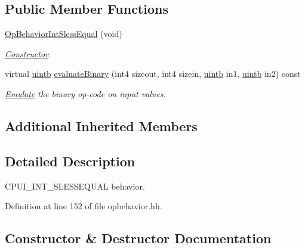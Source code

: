 \subsection*{Public Member Functions}
\begin{DoxyCompactItemize}
\item 
\mbox{\hyperlink{class_op_behavior_int_sless_equal_acd8be4a88098b0fa2cd90ee7ad3f614b}{Op\+Behavior\+Int\+Sless\+Equal}} (void)
\begin{DoxyCompactList}\small\item\em \mbox{\hyperlink{class_constructor}{Constructor}}. \end{DoxyCompactList}\item 
virtual \mbox{\hyperlink{types_8h_a2db313c5d32a12b01d26ac9b3bca178f}{uintb}} \mbox{\hyperlink{class_op_behavior_int_sless_equal_a15f037e586698f31a78b33ea86bd40c5}{evaluate\+Binary}} (int4 sizeout, int4 sizein, \mbox{\hyperlink{types_8h_a2db313c5d32a12b01d26ac9b3bca178f}{uintb}} in1, \mbox{\hyperlink{types_8h_a2db313c5d32a12b01d26ac9b3bca178f}{uintb}} in2) const
\begin{DoxyCompactList}\small\item\em \mbox{\hyperlink{class_emulate}{Emulate}} the binary op-\/code on input values. \end{DoxyCompactList}\end{DoxyCompactItemize}
\subsection*{Additional Inherited Members}


\subsection{Detailed Description}
C\+P\+U\+I\+\_\+\+I\+N\+T\+\_\+\+S\+L\+E\+S\+S\+E\+Q\+U\+AL behavior. 

Definition at line 152 of file opbehavior.\+hh.



\subsection{Constructor \& Destructor Documentation}
\mbox{\label{class_op_behavior_int_sless_equal_acd8be4a88098b0fa2cd90ee7ad3f614b}} 
